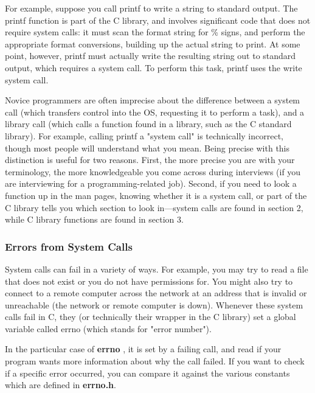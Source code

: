 \documentclass[11pt, a4paper]{article}
\begin{document}
For example, suppose you call printf to write a string to standard output. The printf function is part of the C library, and involves significant code that does not require system calls: it must scan the format string for \% signs, and perform the appropriate format conversions, building up the actual string to print. At some point, however, printf must actually write the resulting string out to standard output, which requires a system call. To perform this task, printf uses the write system call.

Novice programmers are often imprecise about the difference between a system call (which transfers control into the OS, requesting it to perform a task), and a library call (which calls a function found in a library, such as the C standard library). For example, calling printf a "system call" is technically incorrect, though most people will understand what you mean. Being precise with this distinction is useful for two reasons. First, the more precise you are with your terminology, the more knowledgeable you come across during interviews (if you are interviewing for a programming-related job). Second, if you need to look a function up in the man pages, knowing whether it is a system call, or part of the C library tells you which section to look in—system calls are found in section 2, while C library functions are found in section 3.



\subsubsection{Errors from System Calls}%
\label{ssub:errors_from_system_calls}



System calls can fail in a variety of ways. For example, you may try to read a file that does not exist or you do not have permissions for. You might also try to connect to a remote computer across the network at an address that is invalid or unreachable (the network or remote computer is down). Whenever these system calls fail in C, they (or technically their wrapper in the C library) set a global variable called errno (which stands for "error number").


In the particular case of \textbf{errno} , it is set by a failing call, and read if your program wants more information about why the call failed. If you want to check if a specific error occurred, you can compare it against the various constants which are defined in \textbf{errno.h}.
\end{document}
